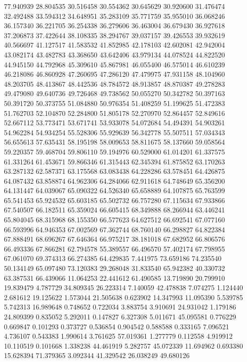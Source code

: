 77.940939
28.804535
30.516458
30.554362
30.645629
30.920600
31.476474
32.492488
33.594312
34.648951
35.283109
35.771759
35.955010
36.068246
36.157340
36.221705
36.254338
36.279606
36.463004
36.679430
36.927618
37.206873
37.422644
38.108335
38.294767
39.037157
39.426553
39.932619
40.566697
41.127517
41.583532
41.852985
42.178103
42.602081
42.942004
43.082174
43.482783
43.368650
43.642406
43.979134
44.078524
44.822520
44.945150
44.792968
45.309610
45.867981
46.055400
46.575014
46.610239
46.218086
46.860928
47.260695
47.286120
47.479975
47.931158
48.104960
48.203705
48.413867
48.442536
48.784572
48.913857
48.870387
49.278283
49.479080
49.640736
49.726468
49.738562
50.055270
50.342782
50.397163
50.391720
50.373755
51.084880
50.976354
51.408259
51.199625
51.472383
51.762703
52.104870
52.284800
51.805178
52.270970
52.864457
52.849616
52.667112
53.773471
53.671741
53.933078
54.072684
54.494391
54.903261
54.962284
54.934254
55.528306
55.929639
56.342778
55.507511
57.034343
56.655613
57.635431
58.195198
58.009653
58.811675
58.137660
59.058564
59.220357
59.468704
59.806110
59.194976
60.529000
61.014201
61.337575
61.331264
61.453671
59.866346
61.315443
62.345394
61.875852
63.170263
63.287132
62.587371
63.175568
63.083438
64.228286
63.578451
64.426875
64.087432
63.858874
64.962306
64.284066
62.911618
64.748649
65.356200
64.131447
64.039067
65.090322
64.526340
65.658889
64.107875
65.763599
65.541453
65.924532
65.603185
65.502732
66.757280
67.115634
67.933866
67.540507
66.182511
65.359024
66.605415
68.349888
68.266944
63.446241
65.804045
68.315968
68.155350
66.577623
64.627512
66.692541
67.077160
66.593996
64.946353
67.002569
67.362744
68.760140
66.298827
64.822384
67.888491
68.696267
67.646364
66.975217
38.181018
67.682952
66.806576
66.493336
67.866281
62.794578
55.389557
66.496570
57.402174
67.798955
67.061070
69.374313
66.274385
64.429835
7.441975
73.659186
74.235540
50.134149
65.097480
73.120383
29.268048
31.833540
65.942382
40.330732
63.387531
66.439066
11.064253
22.441612
61.490585
13.719890
20.799910
19.839479
4.787729
34.809345
26.223314
7.140059
42.478838
7.074275
1.124440
2.681612
19.125622
1.573044
21.505638
0.623902
14.347993
11.095390
5.539785
5.742313
16.989648
0.748652
0.722034
3.883754
3.910691
24.931042
1.179186
24.809399
0.835052
5.292011
0.147827
6.327308
5.011671
45.095581
0.776229
0.669847
0.101293
0.373727
0.536854
0.904542
0.588588
0.333165
7.096521
4.736107
0.543383
1.990614
3.761625
57.019361
1.277779
0.112558
4.919912
10.110519
0.101668
1.338238
44.461919
5.282757
45.072339
11.694962
0.693380
15.628394
71.379365
3.092344
41.329542
26.038249
49.680126
